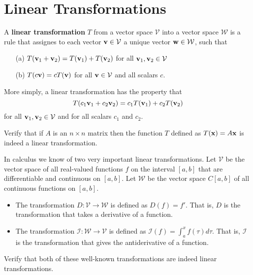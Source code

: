 \section{Linear Transformations}
\begin{definition}
    A {\bf linear transformation} $T$ from a vector space $\mathcal{V}$ into a vector
    space $\mathcal{W}$ is a rule that assignes to each vector ${\bf v} \in \mathcal{V}$ a
    unique vector ${\bf w} \in \mathcal{W}$, such that
    \begin{enumerate}
        \item[(a)] $T({\bf v}_1 + {\bf v}_2) = T({\bf v}_1) + T({\bf v}_2)$ for all ${\bf v}_1, {\bf v}_2 \in \mathcal{V}$
        \item[(b)] $T(c{\bf v}) = c T({\bf v})$ for all ${\bf v} \in \mathcal{V}$ and all scalars
            $c$.
    \end{enumerate}
    More simply, a linear transformation has the property that
    \[ T(c_1 {\bf v}_1 + c_2 {\bf v}_2) = c_1 T({\bf v}_1) + c_2 T({\bf v}_2) \]
    for all ${\bf v}_1 ,{\bf v}_2 \in \mathcal{V}$ and for all scalars $c_1$ and $c_2$.
\end{definition}

\begin{problem}
    Verify that if $A$ is an $n \times n$ matrix then the function $T$ defined as $T({\bf x}) =
    A{\bf x}$ is indeed a linear transformation.
\end{problem}

\begin{problem}\label{prob:calc_lt}
    In calculus we know of two very important linear transformations.  Let $\mathcal{V}$
    be the vector space of all real-valued functions $f$ on the interval $[a,b]$ that are
    differentiable and continuous on $[a,b]$.  Let $\mathcal{W}$ be the vector space
    $C[a,b]$ of all continuous functions on $[a,b]$.  
    \begin{itemize}
        \item The transformation $D: \mathcal{V} \to \mathcal{W}$ is defined as $D(f) =
            f'$.  That is, $D$ is the transformation that takes a derivative of a
            function.
        \item The transformation $\mathcal{I}: \mathcal{W} \to \mathcal{V}$ is defined as
            $\mathcal{I}(f) = \int_a^x f(\tau) d\tau$.  That is, $\mathcal{I}$ is the
            transformation that gives the antiderivative of a function.
    \end{itemize}
    Verify that both of these well-known transformations are indeed linear
    transformations.
\end{problem}

